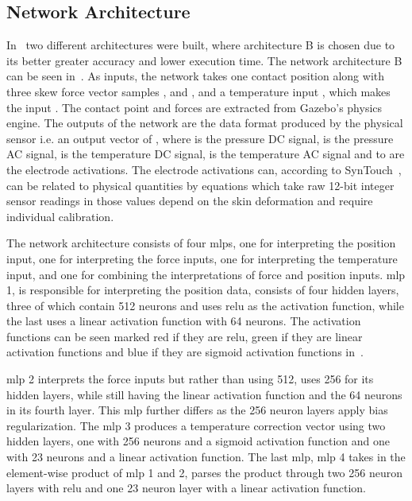 \subsection{Network Architecture}\label{sec:1-tactile-perception-method-network-architecture}
In~\cite{simulation-of-the-syntouch-biotac-sensor} two different architectures were built, where architecture B is chosen due to its better greater accuracy and lower execution time. The network architecture B can be seen in~. As inputs, the network takes one contact position  along with three skew force vector samples ,  and , and a temperature input , which makes the input . The contact point and forces are extracted from Gazebo's physics engine. The outputs of the network are the data format produced by the physical sensor i.e. an output vector of , where  is the pressure DC signal,  is the pressure AC signal,  is the temperature DC signal,  is the temperature AC signal and  to  are the electrode activations. The electrode activations can, according to SynTouch~\cite{biotac-syntouch-manual}, can be related to physical quantities by equations which take raw \num{12}-bit integer sensor readings in \mvar{[0,4095]} those values depend on the skin deformation and require individual calibration.\medskip

The network architecture consists of four \gls{mlp}s, one for interpreting the position input, one for interpreting the force inputs, one for interpreting the temperature input, and one for combining the interpretations of force and position inputs. \gls{mlp} \num{1}, is responsible for interpreting the position data, consists of four hidden layers, three of which contain \num{512} neurons and uses \gls{relu} as the activation function, while the last uses a linear activation function with \num{64} neurons. The activation functions can be seen marked red if they are \gls{relu}, green if they are linear activation functions and blue if they are sigmoid activation functions in~. \medskip

\gls{mlp} \num{2} interprets the force inputs but rather than using \num{512}, uses \num{256} for its hidden layers, while still having the linear activation function and the \num{64} neurons in its fourth layer. This \gls{mlp} further differs as the \num{256} neuron layers apply  bias regularization. The \gls{mlp} \num{3} produces a temperature correction vector using two hidden layers, one with \num{256} neurons and a sigmoid activation function and one with \num{23} neurons and a linear activation function. The last \gls{mlp}, \gls{mlp} \num{4} takes in the element-wise product of \gls{mlp} \num{1} and \num{2}, parses the product through two \num{256} neuron layers with \gls{relu} and one \num{23} neuron layer with a linear activation function.\medskip


